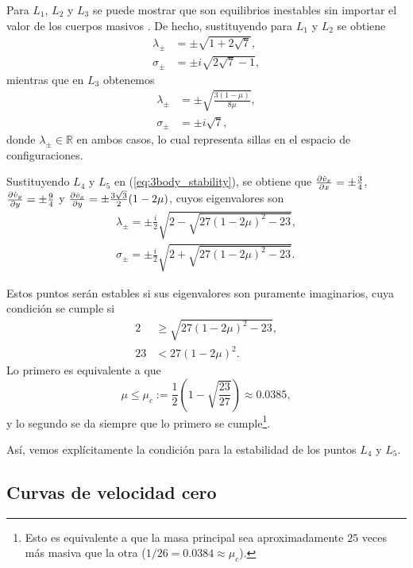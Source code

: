 Para $L_1$, $L_2$ y $L_3$ se puede mostrar que son equilibrios inestables sin importar el valor de los cuerpos masivos \cite{MirelesJames2006}. De hecho, sustituyendo para $L_1$ y $L_2$ se obtiene
\begin{align*}
 \lambda_\pm &= \pm  \sqrt{1 + 2\sqrt{7}}, \\
 \sigma_\pm &= \pm i \sqrt{2\sqrt{7} - 1},
\end{align*}
mientras que en $L_3$ obtenemos 
\begin{align*}
 \lambda_\pm &= \pm \sqrt{ \frac{3(1 - \mu)}{8\mu} }, \\
 \sigma_\pm &= \pm i \sqrt{7},
\end{align*}
donde $\lambda_\pm \in \mathbb{R}$ en ambos casos, lo cual representa sillas en el espacio de configuraciones.

Sustituyendo $L_4$ y $L_5$ en (\ref{eq:3body_stability}), se obtiene que $\frac{\partial \dot{v}_x}{\partial x} = \pm \frac{3}{4}$, $\frac{\partial \dot{v}_y}{\partial y} = \pm \frac{9}{4}$ y $\frac{\partial \dot{v}_x}{\partial y} = \pm \frac{3\sqrt{3}}{2} (1-2\mu) $, cuyos eigenvalores son
\begin{align*}
 \lambda_\pm = \pm \frac{i}{2} \sqrt{ 2 - \sqrt{27(1-2\mu)^2 - 23} }, \\
 \sigma_\pm = \pm \frac{i}{2} \sqrt{ 2 + \sqrt{27(1-2\mu)^2 - 23} }.
 \end{align*}

Estos puntos serán estables si sus eigenvalores son puramente imaginarios, cuya condición se cumple si 
\begin{align*}
 2 &\geq \sqrt{27(1-2\mu)^2 - 23}, \\
 23 &< 27(1-2\mu)^2.
\end{align*}
Lo primero es equivalente a que 
\begin{equation}
 \mu \leq \mu_c := \frac{1}{2} \left(1 - \sqrt{\frac{23}{27}} \right) \approx 0.0385,
 \label{eq:mu_critica}
\end{equation}
y lo segundo se da siempre que lo primero se cumple\footnote{Esto es equivalente a que la masa principal sea aproximadamente $25$ veces más masiva que la otra ($1/26 = 0.0384 \approx \mu_c$).}.

Así, vemos explícitamente la condición para la estabilidad de los puntos $L_4$ y $L_5$. 

\subsection{Curvas de velocidad cero}
\label{sec:zvc}

